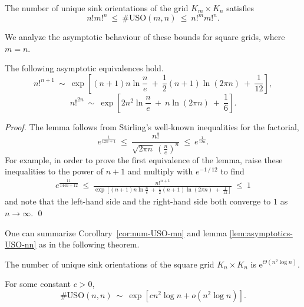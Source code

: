 \documentclass[runningheads,a4paper]{llncs}
\newcommand{\USO}{\ensuremath{\mathrm{USO}}}
\newcommand{\e}{\ensuremath{\mathrm{e}}}
\begin{document}
\begin{corollary}
    \label{cor:num-USO-mn}
    The number of unique sink orientations of the grid
    $K_m \times K_n$ satisfies
    \[
        n! m!^n ~\le~ \#\USO(m,n) ~\le~ n!^m m!^n.
    \]
\end{corollary}

\noindent
We analyze the asymptotic behaviour of these bounds for square grids, where
$m=n$.

\begin{lemma}
    \label{lem:asymptotics-USO-nn}
    The following asymptotic equivalences hold.
    \[
        n!^{n+1} ~\sim~
            \exp \left[
                (n+1) n \ln \frac{n}{e} ~+~ \frac{1}{2} (n+1) \ln (2 \pi n) ~+~ \frac{1}{12}
            \right],
    \]
    \[
        n!^{2n} ~\sim~
        \exp \left[
            2n^2 \ln \frac{n}{e} ~+~ n \ln (2 \pi n) ~+~ \frac{1}{6}
        \right].
    \]
\end{lemma}

\begin{proof}
    The lemma follows from Stirling's well-known inequalities for the factorial,
    \[
        e ^ \frac{1}{12n+1}
        ~\le~
        \frac{ n! }{ \sqrt{2 \pi n} ~ \left( \frac{n}{e} \right) ^ n }
        ~\le~
        e ^ \frac{1}{12n} .
    \]
    For example, in order to prove the first equivalence of the lemma, raise
    these inequalities to the power of $n+1$ and multiply with
    $e ^ { -1\,/\,12 }$ to find
    \begin{align*}
        e ^ \frac{11}{144n+12}
        ~\le~
        \frac{ n!^{n+1} }{ \exp \left[
                                    (n+1) n \ln \frac{n}{e} ~+~
                                    \frac{1}{2} (n+1) \ln (2 \pi n)
                                    ~+~ \frac{1}{12} \right] }
        ~\le~
        1
    \end{align*}
    and note that the left-hand side and the right-hand side both converge to $1$
    as $n \to \infty$. \qed
\end{proof}

One can summarize Corollary~\ref{cor:num-USO-mn} and lemma
\ref{lem:asymptotics-USO-nn} as in the following theorem.

\begin{theorem}
    \label{thm:asymptotics-USO-nn}
    The number of unique sink orientations of the square grid $K_n \times K_n$
    is $\e ^ { \Theta(n^2 \log n) }$.
\end{theorem}

\begin{conjecture}
    For some constant $c > 0$,
    \[
        \#\USO(n,n) ~\sim~ \exp\left[ c n^2 \log n + o(n^2 \log n) \right].
    \]
\end{conjecture}
\end{document}
